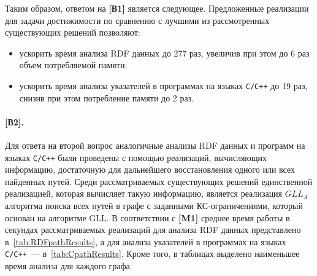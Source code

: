 Таким образом, ответом на \textbf{[В1]} является следующее. Предложенные реализации для задачи достижимости по сравнению с лучшими из рассмотренных существующих решений позволяют:
\begin{itemize}
    \item ускорить время анализа RDF данных до 277 раз, увеличив при этом до 6 раз объем потребляемой памяти;
    \item ускорить время анализа указателей в программах на языках \texttt{C/C++} до 19 раз, снизив при этом потребление памяти до 2 раз.
\end{itemize}

\paragraph{[В2].} Для ответа на второй вопрос аналогичные анализы RDF данных и программ на языках \texttt{C/C++} были проведены с помощью реализаций, вычисляющих информацию, достаточную для дальнейшего восстановления одного или всех найденных путей. Среди рассматриваемых существующих решений единственной реализацией, которая вычисляет такую информацию, является реализация $\textit{GLL}_{\textit{A}}$ алгоритма поиска всех путей в графе с заданными КС-ограничениями, который основан на алгоритме GLL. В соответствии с \textbf{[M1]} среднее время работы в секундах рассматриваемых реализаций для анализа RDF данных представлено в~\cref{tab:RDFpathResults}, а для анализа указателей в программах на языках \texttt{C/C++}~--- в~\cref{tab:CpathResults}. Кроме того, в таблицах выделено наименьшее время анализа для каждого графа.

